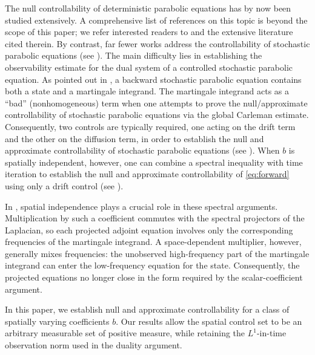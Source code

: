 \documentclass[print,wide]{draft}
\begin{document}
The null controllability of deterministic parabolic equations has by now been studied extensively. A comprehensive list of references on this topic is beyond the scope of this paper; we refer interested readers to \cite{FernandezCara2012,LeRousseauLebeauRobbiano2022,Zuazua2007} and the extensive literature cited therein. By contrast, far fewer works address the controllability of stochastic parabolic equations (see \cite{Barbu2003,HernandezSantamaria2023,Lu2011,Liu2014,Liu2026,ZhangXuLiu2026,Tang2009}). The main difficulty lies in establishing the observability estimate for the dual system of a controlled stochastic parabolic equation. As pointed out in \cite{Barbu2003}, a backward stochastic parabolic equation contains both a state and a martingale integrand. The martingale integrand acts as a ``bad'' (nonhomogeneous) term when one attempts to prove the null/approximate controllability of stochastic parabolic equations via the global Carleman estimate. Consequently, two controls are typically required, one acting on the drift term and the other on the diffusion term, in order to establish the null and approximate controllability of stochastic parabolic equations (see \cite{HernandezSantamaria2023,Liu2014,ZhangXuLiu2026,Tang2009}). When $b$ is spatially independent, however, one can combine a spectral inequality with time iteration to establish the null and approximate controllability of \eqref{eq:forward} using only a drift control (see \cite{Lu2011,Yang2016a,Liu2026}).

In \cite{Lu2011,Yang2016a,Liu2026}, spatial independence plays a crucial role in these spectral arguments.   Multiplication by such a coefficient commutes with the spectral projectors of the Laplacian, so each projected adjoint equation involves only the corresponding frequencies of the martingale integrand. A space-dependent multiplier, however, generally mixes frequencies: the unobserved high-frequency part of the martingale integrand can enter the low-frequency equation for the state. Consequently, the projected equations no longer close in the form required by the scalar-coefficient argument.

In this paper, we establish null and approximate controllability for a class of spatially varying coefficients $b$. Our results allow the spatial control set to be an arbitrary measurable set of positive measure, while retaining the $L^1$-in-time observation norm used in the duality argument.  
\end{document}
